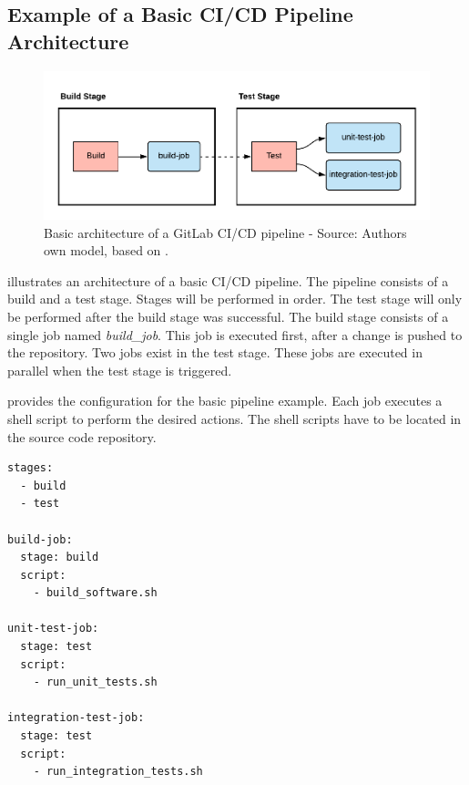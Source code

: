 \subsection{Example of a Basic CI/CD Pipeline Architecture}

\begin{figure}[h]
\centering
\includegraphics[scale=0.8]{images/04_technical_background/gitlab/basic_pipeline}
\caption{Basic architecture of a GitLab CI/CD pipeline - Source: Authors own model, based on \cite{Gitlab2020Docs}.}
\label{fig:04_gitlab_pipeline_basic_arch}
\end{figure}

 illustrates an architecture of a basic CI/CD pipeline.
The pipeline consists of a build and a test stage. Stages will be performed in order. The test stage will only be performed after the build stage was successful.
The build stage consists of a single job named \textit{build\_job}. This job is executed first, after a change is pushed to the repository.
Two jobs exist in the test stage. These jobs are executed in parallel when the test stage is triggered.



 provides the configuration for the basic pipeline example.
Each job executes a shell script to perform the desired actions. The shell scripts have to be located in the source code repository.
\begin{lstlisting}[label=lst:04_gitlab_pipeline_basic_config-example, caption=Example of a \texttt{.gitlab-ci.yml} configuration file]
stages:
  - build
  - test

build-job:
  stage: build
  script:
    - build_software.sh

unit-test-job:
  stage: test
  script:
    - run_unit_tests.sh
    
integration-test-job:
  stage: test
  script:
    - run_integration_tests.sh
\end{lstlisting}



